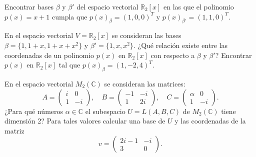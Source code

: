 \begin{ejercicio} Encontrar bases \( \beta \) y \( \beta' \) del espacio vectorial \( \mathbb{R}_2[x] \) en las que el polinomio \( p(x) = x + 1 \) cumpla que \( p(x)_\beta = (1, 0, 0)^T \) y \( p(x)_{\beta'} = (1, 1, 0)^T \).
\end{ejercicio}


\begin{ejercicio} En el espacio vectorial \( V = \mathbb{R}_2[x] \) se consideran las bases \( \beta = \{1, 1 + x, 1 + x + x^2\} \) y \( \beta' = \{1, x, x^2\} \). ¿Qué relación existe entre las coordenadas de un polinomio \( p(x) \) en \( \mathbb{R}_2[x] \) con respecto a \( \beta \) y \( \beta' \)? Encontrar \( p(x) \) en \( \mathbb{R}_2[x] \) tal que \( p(x)_\beta = (1, -2, 4)^T \).
\end{ejercicio}


\begin{ejercicio} En el espacio vectorial \( M_2(\mathbb{C}) \) se consideran las matrices:
	\[
		A = \begin{pmatrix} i & 0 \\ 1 & -i \end{pmatrix}, \quad
		B = \begin{pmatrix} -1 & -i \\ 1 & 2i \end{pmatrix}, \quad
		C = \begin{pmatrix} \alpha & 0 \\ 1 & -i \end{pmatrix}.
	\]
	¿Para qué números \( \alpha \in \mathbb{C} \) el subespacio \( U = L(A, B, C) \) de \( M_2(\mathbb{C}) \) tiene dimensión 2? Para tales valores calcular una base de \( U \) y las coordenadas de la matriz
	\[
		v = \begin{pmatrix} 2i - 1 & -i \\ 3 & 0 \end{pmatrix}.
	\]
\end{ejercicio}

